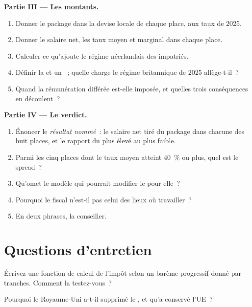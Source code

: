 \begin{problem}
\medskip\noindent\textbf{Partie III --- Les montants.}
\begin{enumerate}[resume]
\item Donner le package dans la devise locale de chaque place, aux taux de 2025.
\item Donner le salaire net, les taux moyen et marginal dans chaque place.
\item Calculer ce qu'ajoute le régime néerlandais des impatriés.
\item Définir la  et un ~; quelle charge le régime britannique de 2025 allège-t-il~?
\item Quand la rémunération différée est-elle imposée, et quelles trois conséquences en découlent~?
\end{enumerate}

\medskip\noindent\textbf{Partie IV --- Le verdict.}
\begin{enumerate}[resume]
\item Énoncer le \emph{résultat nommé}~: le salaire net tiré du package dans chacune des huit places, et le rapport du plus élevé
au plus faible.
\item Parmi les cinq places dont le taux moyen atteint 40~\% ou plus, quel est le spread~?
\item Qu'omet le modèle qui pourrait modifier le  pour elle~?
\item Pourquoi le  fiscal n'est-il pas celui des lieux où travailler~?
\item En deux phrases, la conseiller.
\end{enumerate}
\end{problem}

\section{Questions d'entretien}

\begin{interviewq}\label{iq:in:pay-regulation-and-tax-by-location:1}
Écrivez une fonction de calcul de l'impôt selon un barème progressif donné par tranches. Comment la testez-vous~?
\end{interviewq}

\begin{interviewq}\label{iq:in:pay-regulation-and-tax-by-location:2}
Pourquoi le Royaume-Uni a-t-il supprimé le , et qu'a conservé l'UE~?
\end{interviewq}

